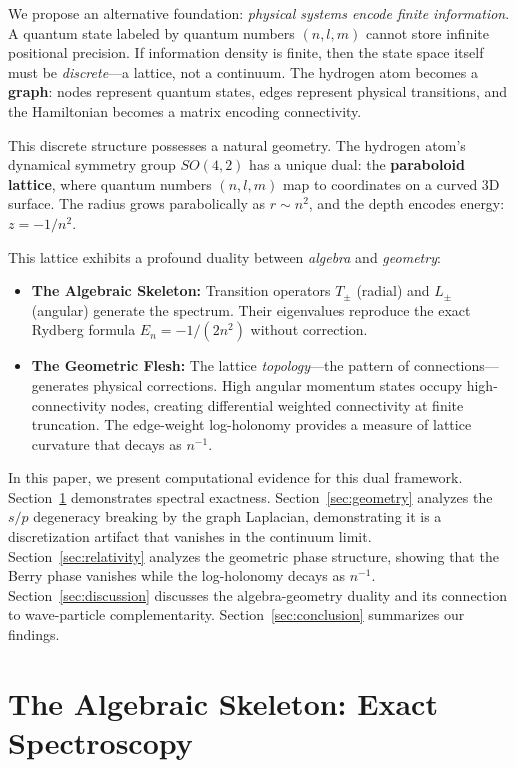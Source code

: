 \documentclass[aps,pra,twocolumn,superscriptaddress,longbibliography]{revtex4-2}
\begin{document}
We propose an alternative foundation: \textit{physical systems encode finite information}. A quantum state labeled by quantum numbers $(n, l, m)$ cannot store infinite positional precision. If information density is finite, then the state space itself must be \textit{discrete}---a lattice, not a continuum. The hydrogen atom becomes a \textbf{graph}: nodes represent quantum states, edges represent physical transitions, and the Hamiltonian becomes a matrix encoding connectivity.

This discrete structure possesses a natural geometry. The hydrogen atom's dynamical symmetry group $SO(4,2)$ \cite{barut1967,fock1935} has a unique dual: the \textbf{paraboloid lattice}, where quantum numbers $(n, l, m)$ map to coordinates on a curved 3D surface. The radius grows parabolically as $r \sim n^2$, and the depth encodes energy: $z = -1/n^2$.

This lattice exhibits a profound duality between \textit{algebra} and \textit{geometry}:
\begin{itemize}
\item \textbf{The Algebraic Skeleton:} Transition operators $T_\pm$ (radial) and $L_\pm$ (angular) generate the spectrum. Their eigenvalues reproduce the exact Rydberg formula $E_n = -1/(2n^2)$ without correction.
\item \textbf{The Geometric Flesh:} The lattice \textit{topology}---the pattern of connections---generates physical corrections. High angular momentum states occupy high-connectivity nodes, creating differential weighted connectivity at finite truncation. The edge-weight log-holonomy provides a measure of lattice curvature that decays as $n^{-1}$.
\end{itemize}

In this paper, we present computational evidence for this dual framework. Section~\ref{sec:algebra} demonstrates spectral exactness. Section~\ref{sec:geometry} analyzes the $s/p$ degeneracy breaking by the graph Laplacian, demonstrating it is a discretization artifact that vanishes in the continuum limit. Section~\ref{sec:relativity} analyzes the geometric phase structure, showing that the Berry phase vanishes while the log-holonomy decays as $n^{-1}$. Section~\ref{sec:discussion} discusses the algebra-geometry duality and its connection to wave-particle complementarity. Section~\ref{sec:conclusion} summarizes our findings.


\section{The Algebraic Skeleton: Exact Spectroscopy}
\label{sec:algebra}
\end{document}
